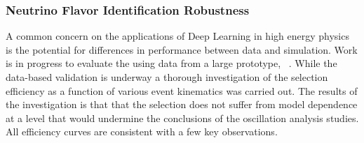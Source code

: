 
\subsubsection{Neutrino Flavor Identification Robustness}
A common concern on the applications of Deep Learning in high energy physics is the potential for differences in performance between data and simulation. Work is in progress to evaluate the   using data from a large  prototype, ~\cite{Abi:2017aow}.
While the data-based validation is underway a thorough investigation of the selection efficiency as a function of various event kinematics was carried out. The results of the investigation is that that the  selection does not suffer from model dependence at a level that would undermine the conclusions of the oscillation analysis studies. All efficiency curves are consistent with a few key observations. 

